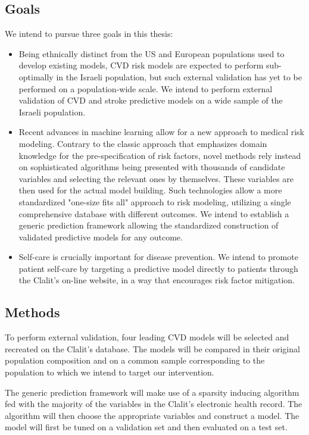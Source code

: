 \documentclass[a4paper,12pt]{article}
\begin{document}
		\subsection{Goals}
		We intend to pursue three goals in this thesis:
		\begin{itemize}
			\item Being ethnically distinct from the US and European populations used to develop existing models, CVD risk models are expected to perform sub-optimally in the Israeli population, but such external validation has yet to be performed on a population-wide scale\cite{Lovis2015}. We intend to perform external validation of CVD and stroke predictive models on a wide sample of the Israeli population.
			\item Recent advances in machine learning allow for a new approach to medical risk modeling\cite{Obermeyer2016}. Contrary to the classic approach that emphasizes domain knowledge for the pre-specification of risk factors, novel methods rely instead on sophisticated algorithms being presented with thousands of candidate variables and selecting the relevant ones by themselves. These variables are then used for the actual model building\cite{Weng2017}. Such technologies allow a more standardized "one-size fits all" approach to risk modeling, utilizing a single comprehensive database with different outcomes\cite{Rajkomar2018}. We intend to establish a generic prediction framework allowing the standardized construction of validated predictive models for any outcome.
			\item Self-care is crucially important for disease prevention\cite{Organization1984}. We intend to promote patient self-care by targeting a predictive model directly to patients through the Clalit's on-line website, in a way that encourages risk factor mitigation.
		\end{itemize}
	
		\subsection{Methods}
		To perform external validation, four leading CVD models will be selected and recreated on the Clalit's database. The models will be compared in their original population composition and on a common sample corresponding to the population to which we intend to target our intervention.
		
		The generic prediction framework will make use of a sparsity inducing algorithm fed with the majority of the variables in the Clalit's electronic health record. The algorithm will then choose the appropriate variables and construct a model. The model will first be tuned on a validation set and then evaluated on a test set.
		
\end{document}
